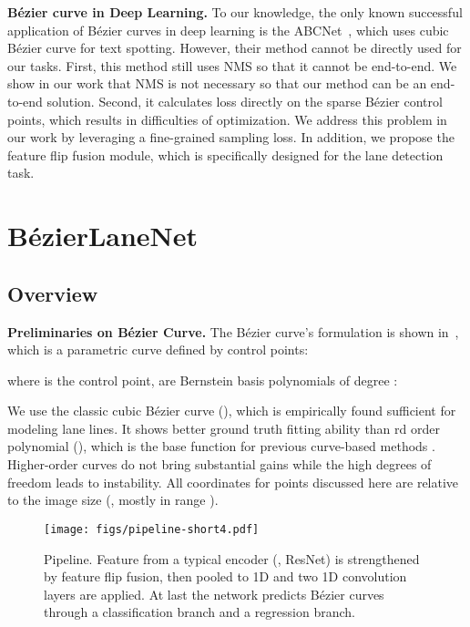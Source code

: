 \documentclass[10pt,twocolumn,letterpaper]{article}
\begin{document}
\noindent \textbf{Bézier curve in Deep Learning.} To our knowledge, the only known successful application of Bézier curves in deep learning is the ABCNet~\cite{liu2020abcnet}, which uses cubic Bézier curve for text spotting. 
However, their method cannot be directly used for our tasks.
First, this method still uses NMS so that it cannot be end-to-end. We show in our work that NMS is not necessary so that our method can be an end-to-end solution.
Second, it calculates  loss directly on the sparse Bézier control points, which results in difficulties of optimization.
We address this problem in our work by leveraging a fine-grained sampling loss.
In addition, we propose the feature flip fusion module, which is specifically designed for the lane detection task.

\section{BézierLaneNet}
\label{sec:BézierLaneNet}

\subsection{Overview}
\label{sec:over}

\noindent \textbf{Preliminaries on Bézier Curve.} The Bézier curve's formulation is shown in~, which is a parametric curve defined by  control points:

\vspace{-3mm}

where  is the  control point,  are Bernstein basis polynomials of degree :


We use the classic cubic Bézier curve (), which is empirically found sufficient for modeling lane lines. It shows better ground truth fitting ability than rd order polynomial (), which is the base function for previous curve-based methods \cite{tabelini2021polylanenet,liu2021end}. Higher-order curves do not bring substantial gains while the high degrees of freedom leads to instability. All coordinates for points discussed here are relative to the image size (\ie, mostly in range ). 

\begin{figure}[t]
    \centering
    \texttt{[image: figs/pipeline-short4.pdf]}
    \vspace{-1mm}
    \caption{Pipeline. Feature from a typical encoder (\eg, ResNet) is strengthened by feature flip fusion, then pooled to 1D and two 1D convolution layers are applied. At last the network predicts Bézier curves through a classification branch and a regression branch.}
    \label{fig:pipeline}
    \vspace{-2mm}
\end{figure}
\end{document}
